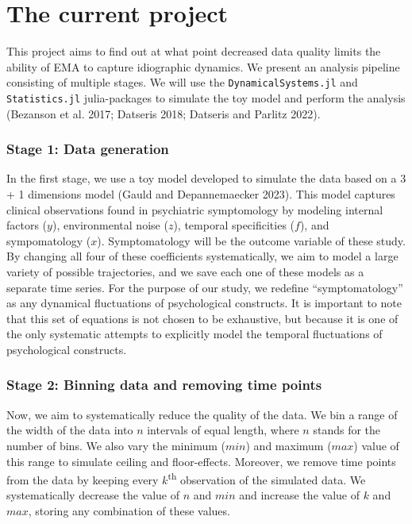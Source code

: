 \documentclass[
  letterpaper,
  DIV=11,
  numbers=noendperiod]{scrartcl}
\begin{document}
\hypertarget{the-current-project}{%
\section{The current project}\label{the-current-project}}

This project aims to find out at what point decreased data quality
limits the ability of EMA to capture idiographic dynamics. We present an
analysis pipeline consisting of multiple stages. We will use the
\texttt{DynamicalSystems.jl} and \texttt{Statistics.jl} julia-packages
to simulate the toy model and perform the analysis (Bezanson et al.
2017; Datseris 2018; Datseris and Parlitz 2022).

\hypertarget{stage-1-data-generation}{%
\subsubsection{Stage 1: Data generation}\label{stage-1-data-generation}}

In the first stage, we use a toy model developed to simulate the data
based on a 3 + 1 dimensions model (Gauld and Depannemaecker 2023). This
model captures clinical observations found in psychiatric symptomology
by modeling internal factors (\(y\)), environmental noise (\(z\)),
temporal specificities (\(f\)), and sympomatology (\(x\)).
Symptomatology will be the outcome variable of these study. By changing
all four of these coefficients systematically, we aim to model a large
variety of possible trajectories, and we save each one of these models
as a separate time series. For the purpose of our study, we redefine
``symptomatology'' as any dynamical fluctuations of psychological
constructs. It is important to note that this set of equations is not
chosen to be exhaustive, but because it is one of the only systematic
attempts to explicitly model the temporal fluctuations of psychological
constructs.

\hypertarget{stage-2-binning-data-and-removing-time-points}{%
\subsubsection{Stage 2: Binning data and removing time
points}\label{stage-2-binning-data-and-removing-time-points}}

Now, we aim to systematically reduce the quality of the data. We bin a
range of the width of the data into \(n\) intervals of equal length,
where \(n\) stands for the number of bins. We also vary the minimum
(\(min\)) and maximum (\(max\)) value of this range to simulate ceiling
and floor-effects. Moreover, we remove time points from the data by
keeping every \(k\)\textsuperscript{th} observation of the simulated
data. We systematically decrease the value of \(n\) and \(min\) and
increase the value of \(k\) and \(max\), storing any combination of
these values.
\end{document}
